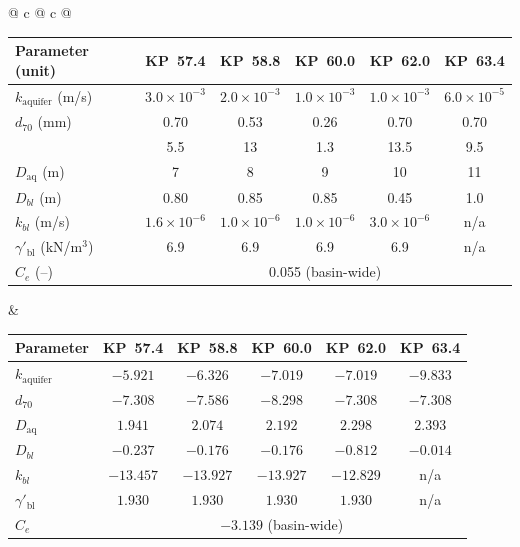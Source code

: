 {\begin{tabular}{@{} c @{\hspace{1em}} c @{}}
    {\scriptsize
     \renewcommand{\arraystretch}{0.85}
     \setlength{\tabcolsep}{3.5pt}
     \begin{tabular}[t]{lccccc}
      \toprule
      Parameter (unit) & KP~57.4 & KP~58.8 & KP~60.0 & KP~62.0 & KP~63.4 \\
      \midrule
      $k_\mathrm{aquifer}$ (m/s) & $3.0\times10^{-3}$ & $2.0\times10^{-3}$ & $1.0\times10^{-3}$ & $1.0\times10^{-3}$ & $6.0\times10^{-5}$ \\
      $d_{70}$ (mm)              & 0.70  & 0.53  & 0.26  & 0.70  & 0.70  \\
      \quad{\tiny[bulk, co-primary]}  & {\tiny 5.5} & {\tiny 13} & {\tiny 1.3} & {\tiny 13.5} & {\tiny 9.5} \\
      $D_\mathrm{aq}$ (m)        & 7     & 8     & 9     & 10    & 11    \\
      $D_{bl}$ (m)               & 0.80  & 0.85  & 0.85  & 0.45  & 1.0   \\
      $k_{bl}$ (m/s)             & $1.6\times10^{-6}$ & $1.0\times10^{-6}$ & $1.0\times10^{-6}$ & $3.0\times10^{-6}$ & n/a \\
      $\gamma'_\mathrm{bl}$ (kN/m$^3$) & 6.9 & 6.9 & 6.9 & 6.9 & n/a \\
      $C_e$ (--)                 & \multicolumn{5}{c}{0.055 (basin-wide)} \\
      \bottomrule
      \end{tabular}%
    }
    &
    {\scriptsize
     \renewcommand{\arraystretch}{0.85}
     \setlength{\tabcolsep}{3.5pt}
     \begin{tabular}[t]{lccccc}
      \toprule
      Parameter & KP~57.4 & KP~58.8 & KP~60.0 & KP~62.0 & KP~63.4 \\
      \midrule
      $k_\mathrm{aquifer}$ & $-5.921$  & $-6.326$  & $-7.019$  & $-7.019$  & $-9.833$ \\
      $d_{70}$             & $-7.308$  & $-7.586$  & $-8.298$  & $-7.308$  & $-7.308$ \\
      $D_\mathrm{aq}$      & $1.941$   & $2.074$   & $2.192$   & $2.298$   & $2.393$  \\
      $D_{bl}$             & $-0.237$  & $-0.176$  & $-0.176$  & $-0.812$  & $-0.014$ \\
      $k_{bl}$             & $-13.457$ & $-13.927$ & $-13.927$ & $-12.829$ & n/a      \\
      $\gamma'_\mathrm{bl}$ & $1.930$   & $1.930$   & $1.930$   & $1.930$   & n/a      \\
      $C_e$                & \multicolumn{5}{c}{$-3.139$ (basin-wide)} \\
      \bottomrule
      \end{tabular}%
    }
  \end{tabular}%
}


